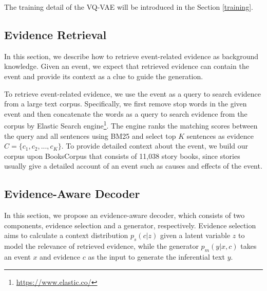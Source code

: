 \documentclass[11pt,a4paper]{article}
\begin{document}
The training detail of the VQ-VAE will be introduced in the Section \ref{training}.














































\subsection{Evidence Retrieval}
In this section, we describe how to retrieve event-related evidence as background knowledge. Given an event, we expect that retrieved evidence can contain the event and provide its context as a clue to guide the generation. 

To retrieve event-related evidence, we use the event as a query to search evidence from a large \mbox{text} corpus. Specifically, we first remove stop words in the given event and then concatenate the \mbox{words} as a query to search evidence from the corpus by \mbox{Elastic} Search engine\footnote{\url{https://www.elastic.co/}}. The engine ranks the matching scores between the query and all sentences using BM25 and select top $K$ sentences as evidence $C=\{c_1,c_2,...,c_K\}$.
To provide detailed context about the event, we build our corpus upon BooksCorpus \cite{zhu2015aligning} that consists of 11,038 story books,
since stories usually give a detailed account of an event such as causes and effects of the event.   

\subsection{Evidence-Aware Decoder}
In this section, we propose an evidence-aware decoder, which consists of two components, evidence selection and a generator, respectively. Evidence selection aims to calculate a context distribution $p_s(c|z)$ given a latent variable $z$ to model the relevance of retrieved evidence, while the generator $p_m(y|x,c)$ takes an event $x$ and evidence $c$ as the input to generate the inferential text $y$.  
\end{document}
